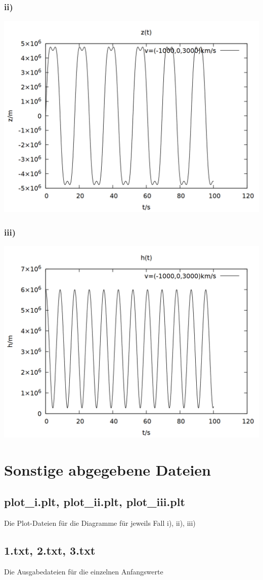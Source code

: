 \documentclass{scrreprt}
\begin{document}
\subsubsection*{ii)}
\begin{center}
\includegraphics[scale=0.25]{plot_3_ii.png}
\end{center}
\subsubsection*{iii)}
\begin{center}
\includegraphics[scale=0.25]{plot_3_iii.png}
\end{center}



\section*{Sonstige abgegebene Dateien}
\subsection*{plot\_i.plt, plot\_ii.plt, plot\_iii.plt}
Die Plot-Dateien für die Diagramme für jeweils Fall i), ii), iii)
\subsection*{1.txt, 2.txt, 3.txt}
Die Ausgabedateien für die einzelnen Anfangswerte
\end{document}
